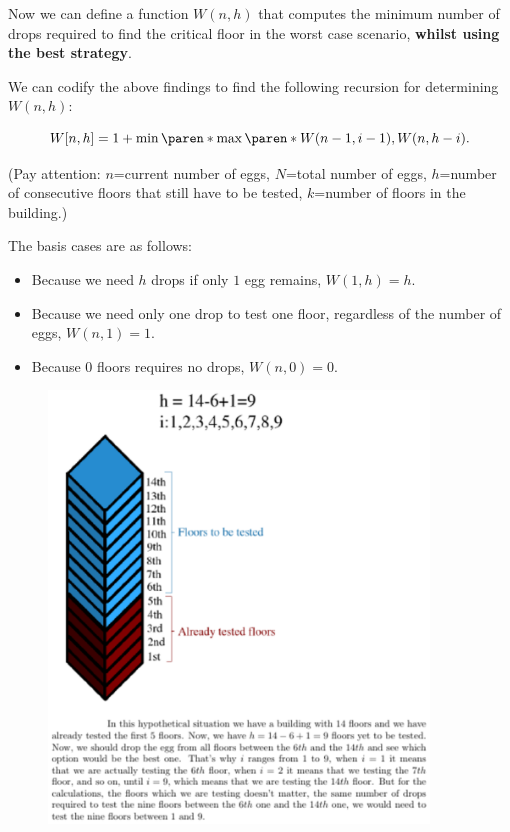 Now we can define a function $W(n,h)$ that computes the minimum number of
drops required to find the critical floor in the worst case scenario,
\textbf{whilst using the best strategy}.

We can codify the above findings to find the following recursion for
determining $W(n,h)$:

\begin{mdframed}[style=mdfNOTE,
frametitle={Definition}]


\begin{equation*}
W[n,h]=1+\min\paren*{\max \paren*{W(n-1,i-1),W(n,h-i)}}.
\end{equation*}

\end{mdframed}
(Pay attention: $n$=current number of eggs, $N$=total number of eggs,
$h$=number of consecutive floors that still have to be tested, $k$=number of
floors in the building.)

The basis cases are as follows:
\begin{itemize}%
\item Because we need $h$ drops if only $1$ egg remains, $W(1,h) = h$.
\item Because we need only one drop to test one floor, regardless of the
  number of eggs, $W(n,1) = 1$.
\item Because $0$ floors requires no drops, $W(n,0)=0$.
\end{itemize}

\begin{figure}
\centering
\includegraphics[width=0.9\textwidth]{Images/figBrilliantEggDropTower.ps}
\end{figure}

